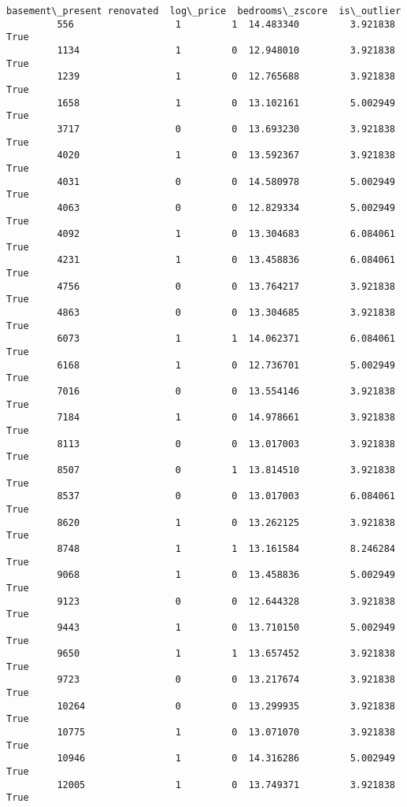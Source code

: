 \documentclass[11pt]{article}
\begin{document}
\begin{Verbatim}[commandchars=\\\{\}]
               basement\_present renovated  log\_price  bedrooms\_zscore  is\_outlier  
         556                  1         1  14.483340         3.921838        True  
         1134                 1         0  12.948010         3.921838        True  
         1239                 1         0  12.765688         3.921838        True  
         1658                 1         0  13.102161         5.002949        True  
         3717                 0         0  13.693230         3.921838        True  
         4020                 1         0  13.592367         3.921838        True  
         4031                 0         0  14.580978         5.002949        True  
         4063                 0         0  12.829334         5.002949        True  
         4092                 1         0  13.304683         6.084061        True  
         4231                 1         0  13.458836         6.084061        True  
         4756                 0         0  13.764217         3.921838        True  
         4863                 0         0  13.304685         3.921838        True  
         6073                 1         1  14.062371         6.084061        True  
         6168                 1         0  12.736701         5.002949        True  
         7016                 0         0  13.554146         3.921838        True  
         7184                 1         0  14.978661         3.921838        True  
         8113                 0         0  13.017003         3.921838        True  
         8507                 0         1  13.814510         3.921838        True  
         8537                 0         0  13.017003         6.084061        True  
         8620                 1         0  13.262125         3.921838        True  
         8748                 1         1  13.161584         8.246284        True  
         9068                 1         0  13.458836         5.002949        True  
         9123                 0         0  12.644328         3.921838        True  
         9443                 1         0  13.710150         5.002949        True  
         9650                 1         1  13.657452         3.921838        True  
         9723                 0         0  13.217674         3.921838        True  
         10264                0         0  13.299935         3.921838        True  
         10775                1         0  13.071070         3.921838        True  
         10946                1         0  14.316286         5.002949        True  
         12005                1         0  13.749371         3.921838        True  

\end{Verbatim}
\end{document}
